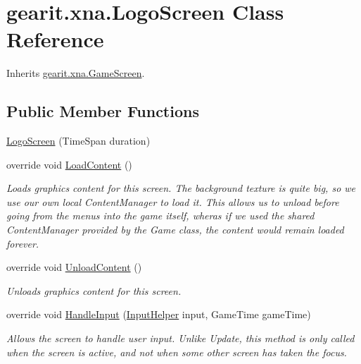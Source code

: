 \hypertarget{classgearit_1_1xna_1_1_logo_screen}{\section{gearit.\+xna.\+Logo\+Screen Class Reference}
\label{classgearit_1_1xna_1_1_logo_screen}
}


Inherits \hyperlink{classgearit_1_1xna_1_1_game_screen}{gearit.\+xna.\+Game\+Screen}.

\subsection*{Public Member Functions}
\begin{DoxyCompactItemize}
\item 
\hyperlink{classgearit_1_1xna_1_1_logo_screen_a85caf8bff892a140e67a9180a0b4594f}{Logo\+Screen} (Time\+Span duration)
\item 
override void \hyperlink{classgearit_1_1xna_1_1_logo_screen_a646c1ee1c9bfcd56b2a2bef091478cab}{Load\+Content} ()
\begin{DoxyCompactList}\small\item\em Loads graphics content for this screen. The background texture is quite big, so we use our own local Content\+Manager to load it. This allows us to unload before going from the menus into the game itself, wheras if we used the shared Content\+Manager provided by the Game class, the content would remain loaded forever. \end{DoxyCompactList}\item 
override void \hyperlink{classgearit_1_1xna_1_1_logo_screen_a4a55ee7caac07a487e50c0c6cb387c91}{Unload\+Content} ()
\begin{DoxyCompactList}\small\item\em Unloads graphics content for this screen. \end{DoxyCompactList}\item 
override void \hyperlink{classgearit_1_1xna_1_1_logo_screen_a915bae9fc8d3fc247b189da675ddf8d2}{Handle\+Input} (\hyperlink{classgearit_1_1xna_1_1_input_helper}{Input\+Helper} input, Game\+Time game\+Time)
\begin{DoxyCompactList}\small\item\em Allows the screen to handle user input. Unlike Update, this method is only called when the screen is active, and not when some other screen has taken the focus. \end{DoxyCompactList}\item 

\end{DoxyCompactItemize}
